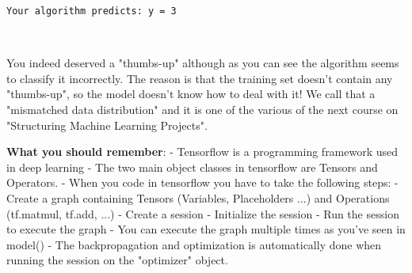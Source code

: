 \documentclass[11pt]{article}
\begin{document}
    \begin{Verbatim}[commandchars=\\\{\}]
Your algorithm predicts: y = 3

    \end{Verbatim}

    \begin{center}
    \end{center}
    { \hspace*{\fill} \\}
    
    You indeed deserved a "thumbs-up" although as you can see the algorithm
seems to classify it incorrectly. The reason is that the training set
doesn't contain any "thumbs-up", so the model doesn't know how to deal
with it! We call that a "mismatched data distribution" and it is one of
the various of the next course on "Structuring Machine Learning
Projects".

     \textbf{What you should remember}: - Tensorflow is a programming
framework used in deep learning - The two main object classes in
tensorflow are Tensors and Operators. - When you code in tensorflow you
have to take the following steps: - Create a graph containing Tensors
(Variables, Placeholders ...) and Operations (tf.matmul, tf.add, ...) -
Create a session - Initialize the session - Run the session to execute
the graph - You can execute the graph multiple times as you've seen in
model() - The backpropagation and optimization is automatically done
when running the session on the "optimizer" object.


    
    
    
    
\end{document}
